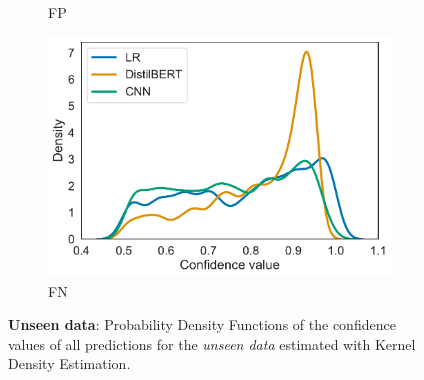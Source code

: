 \begin{figure}[t]
\begin{subfigure}{.49\textwidth}
        \caption{FP}
    \end{subfigure}
    \begin{subfigure}{.49\textwidth}
        \includegraphics[scale=.4]{Figures/confidence-densities-unseen-fn.pdf}
        \caption{FN}
    \end{subfigure}
    \caption{\textbf{Unseen data}: Probability Density Functions of the confidence values of all predictions for the \emph{unseen data} estimated with Kernel Density Estimation.}
    \label{fig:pdfs-unseen}
\end{figure}

